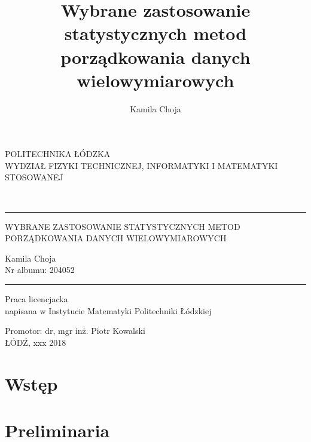 \documentclass[12pt,a4paper]{report}
\author{Kamila Choja}
\title{Wybrane zastosowanie statystycznych metod porządkowania danych wielowymiarowych}
\begin{document}
\begin{titlepage}
\begin{center}
        \vspace*{1cm}
        {\large POLITECHNIKA ŁÓDZKA}\\
       \vspace*{1cm}
        {\large WYDZIAŁ FIZYKI TECHNICZNEJ, INFORMATYKI I MATEMATYKI STOSOWANEJ}\\
        \vspace*{2cm}
    \end{center}        
        
\\
\vspace*{0.3cm}
\hspace*{0.3cm}
  
\begin{center}
\rule{\textwidth}{0.5pt}

\vspace*{0.5cm}
   
{\large WYBRANE ZASTOSOWANIE STATYSTYCZNYCH METOD\\ }
{\large PORZĄDKOWANIA DANYCH WIELOWYMIAROWYCH\\}
\vspace*{1cm}


\begin{flushright}
Kamila Choja\\
Nr albumu: 204052 
 \end{flushright}
\rule{\textwidth}{0.5pt}

Praca licencjacka\\
napisana w Instytucie Matematyki Politechniki Łódzkiej\\

\vspace*{2cm}

Promotor: dr, mgr inż. Piotr Kowalski\\
\vfill
ŁÓDŹ, xxx 2018


     \end{center}   
\end{titlepage}

\tableofcontents

\chapter{Wstęp}


\chapter{Preliminaria}  
\end{document}

